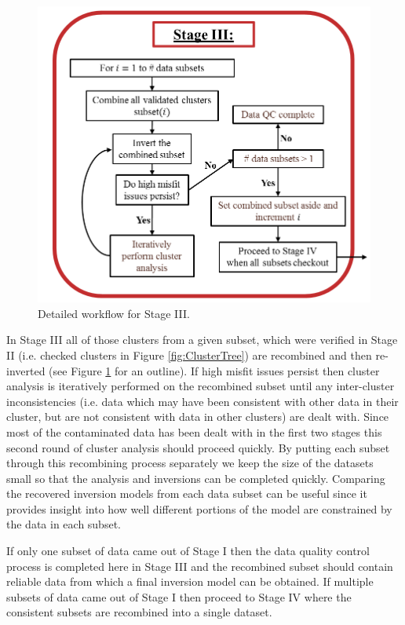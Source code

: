\documentclass[final,authoryear,5p,times,twocolumn]{elsarticle}
\begin{document}
\begin{figure} [!ht]
\begin{center}
   \includegraphics[trim=0cm 0cm 0cm 0cm, clip=true,width=0.8\linewidth]{./Figures/Fig15.pdf}
\end{center}
\caption{Detailed workflow for Stage III.}
\label{fig:DataQC_workflow_StageIII}
\end{figure}

In Stage III all of those clusters from a given subset, which were verified in Stage II (i.e. checked clusters in Figure \ref{fig:ClusterTree}) are recombined and then re-inverted (see Figure \ref{fig:DataQC_workflow_StageIII} for an outline). If high misfit issues persist then cluster analysis is iteratively performed on the recombined subset until any inter-cluster inconsistencies (i.e. data which may have been consistent with other data in their cluster, but are not consistent with data in other clusters) are dealt with. Since most of the contaminated data has been dealt with in the first two stages this second round of cluster analysis should proceed quickly. By putting each subset through this recombining process separately we keep the size of the datasets small so that the analysis and inversions can be completed quickly. Comparing the recovered inversion models from each data subset can be useful since it provides insight into how well different portions of the model are constrained by the data in each subset.

If only one subset of data came out of Stage I then the data quality control process is completed here in Stage III and the recombined subset should contain reliable data from which a final inversion model can be obtained. If multiple subsets of data came out of Stage I then proceed to Stage IV where the consistent subsets are recombined into a single dataset.
\end{document}
